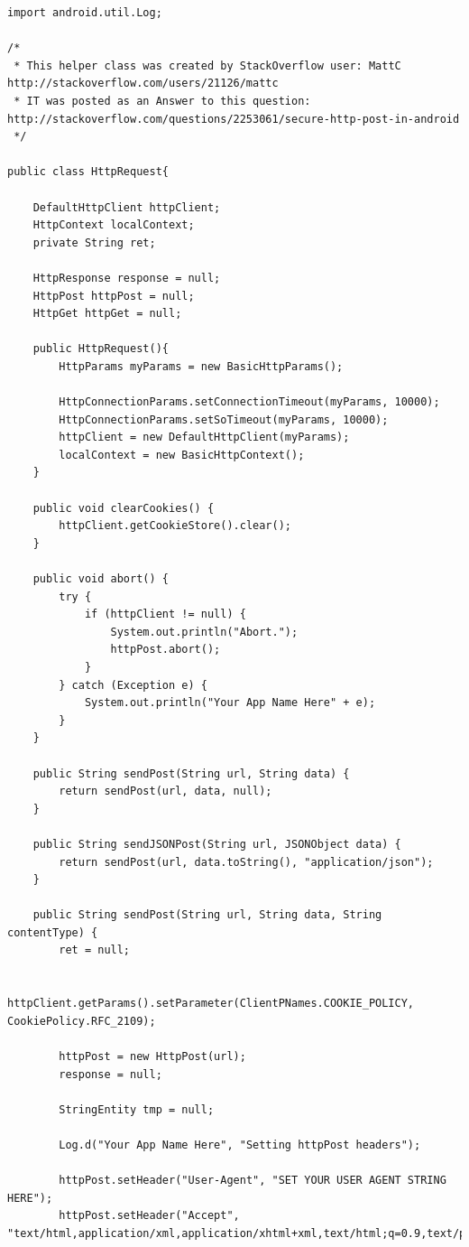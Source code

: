 \documentclass[12pt, %
openright, 
oneside, %
a4paper,    %
brazil]{facom-ufu-abntex2}
\begin{document}
\begin{anexosenv}
\begin{lstlisting}
import android.util.Log;

/*
 * This helper class was created by StackOverflow user: MattC http://stackoverflow.com/users/21126/mattc
 * IT was posted as an Answer to this question: http://stackoverflow.com/questions/2253061/secure-http-post-in-android
 */

public class HttpRequest{

    DefaultHttpClient httpClient;
    HttpContext localContext;
    private String ret;

    HttpResponse response = null;
    HttpPost httpPost = null;
    HttpGet httpGet = null;

    public HttpRequest(){
        HttpParams myParams = new BasicHttpParams();

        HttpConnectionParams.setConnectionTimeout(myParams, 10000);
        HttpConnectionParams.setSoTimeout(myParams, 10000);
        httpClient = new DefaultHttpClient(myParams);       
        localContext = new BasicHttpContext();    
    }

    public void clearCookies() {
        httpClient.getCookieStore().clear();
    }

    public void abort() {
        try {
            if (httpClient != null) {
                System.out.println("Abort.");
                httpPost.abort();
            }
        } catch (Exception e) {
            System.out.println("Your App Name Here" + e);
        }
    }

    public String sendPost(String url, String data) {
        return sendPost(url, data, null);
    }

    public String sendJSONPost(String url, JSONObject data) {
        return sendPost(url, data.toString(), "application/json");
    }

    public String sendPost(String url, String data, String contentType) {
        ret = null;

        httpClient.getParams().setParameter(ClientPNames.COOKIE_POLICY, CookiePolicy.RFC_2109);

        httpPost = new HttpPost(url);
        response = null;

        StringEntity tmp = null;        

        Log.d("Your App Name Here", "Setting httpPost headers");

        httpPost.setHeader("User-Agent", "SET YOUR USER AGENT STRING HERE");
        httpPost.setHeader("Accept", "text/html,application/xml,application/xhtml+xml,text/html;q=0.9,text/plain;q=0.8,image/png,*;q=0.5");


\end{lstlisting}
\end{anexosenv}
\end{document}
